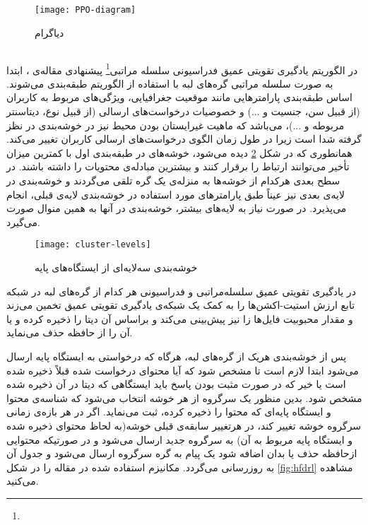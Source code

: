 \begin{figure}[ht]
	\centerline{\texttt{[image: PPO-diagram]}}
	\caption{دیاگرام }
	\label{fig:ppod}
\end{figure}

\newpage
\subsection{}

در الگوریتم یادگیری تقویتی عمیق فدراسیونی سلسله مراتبی\footnote{} پیشنهادی مقاله‌ی \cite{majidi2021hfdrl}، ابتدا به صورت سلسله مراتبی گره‌های لبه با استفاده از الگوریتم  طبقه‌بندی می‌شوند. اساس طبقه‌بندی پارامترهایی مانند موقعیت جغرافیایی، ویژگی‌های مربوط به کاربران (از قبیل سن، جنسیت و ...) و خصوصیات درخواست‌های ارسالی (از قبیل نوع،‌ دیتاسنتر مربوطه و ...)، می‌باشد که ماهیت غیرایستان بودن محیط نیز در خوشه‌بندی در نظز گرفته شدا است زیرا در طول زمان الگوی درخواست‌های ارسالی کاربران تغییر می‌کند. همانطوری که در شکل \ref{fig:cluster-levels} دیده می‌شود، خوشه‌های در طبقه‌بندی اول با کمترین میزان تأخیر می‌توانند ارتباط را برقرار کنند و بیشترین مبادله‌ی محتویات را داشته باشند. در سطح بعدی هرکدام از خوشه‌ها به منزله‌ی یک گره تلقی می‌گردند و خوشه‌بندی در لایه‌ی بعدی نیز عیناً طبق پارامترهای مورد استفاده در خوشه‌بندی لایه‌ی قبلی، انجام می‌پذیرد. در صورت نیاز به لایه‌های بیشتر، خوشه‌بندی در آنها به همین منوال صورت می‌گیرد. 

\begin{figure}[ht]
	\centerline{\texttt{[image: cluster-levels]}}
	\caption{خوشه‌بندی سه‌لایه‌ای از ایستگاه‌های پایه}
	\label{fig:cluster-levels}
\end{figure}

در یادگیری تقویتی عمیق سلسله‌مراتبی و فدراسیونی هر کدام از گره‌های لبه در شبکه تابع ارزش استیت-اکشن‌ها را به کمک یک شبکه‌ی یادگیری تقویتی عمیق تخمین می‌زند و مقدار محبوبیت فایل‌ها زا نیز پیش‌بینی می‌کند و براساس آن دیتا را ذخیره کرده و یا آن را از حافظه حذف می‌نماید.  

پس از خوشه‌بندی هریک از گره‌های لبه،‌ هرگاه که درخواستی به ایستگاه پایه ارسال می‌شود ابتدا لازم است تا مشخص شود که آیا محتوای درخواست شده قبلاً ذخیره شده است یا خیر که در صورت مثبت بودن پاسخ باید ایستگا‌هی که دیتا در آن ذخیره شده مشخص شود. بدین منظور یک سرگروه از هر خوشه انتخاب می‌شود که شناسه‌ی محتوا و ایستگاه پایه‌ای که محتوا را ذخیره کرده، ثبت می‌نماید. اگر در هر بازه‌ی زمانی سرگروه خوشه تغییر کند، در هرتغییر سابقه‌ی قبلی خوشه(به لحاظ محتوای ذخیره شده و ایستگاه پایه مربوط به آن) به سرگروه جدید ارسال می‌شود و در صورتیکه محتوایی ازحافظه حذف یا بدان اضافه شود یک پیام به گره سرگروه ارسال می‌شود و جدول آن به روزرسانی می‌گردد. مکانیزم استفاده شده در مقاله را در شکل \ref{fig:hfdrl} مشاهده می‌کنید.

